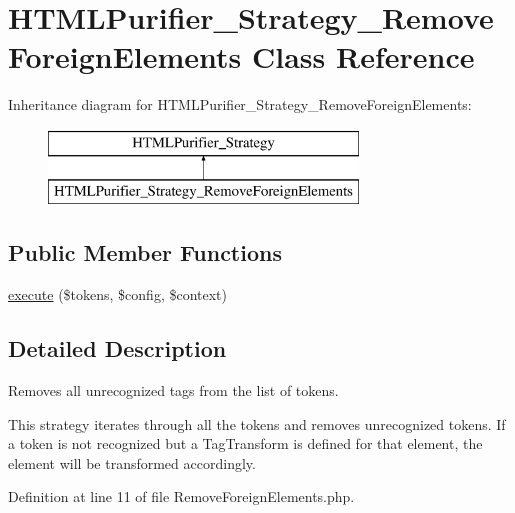 \hypertarget{classHTMLPurifier__Strategy__RemoveForeignElements}{\section{H\+T\+M\+L\+Purifier\+\_\+\+Strategy\+\_\+\+Remove\+Foreign\+Elements Class Reference}
\label{classHTMLPurifier__Strategy__RemoveForeignElements}
}
Inheritance diagram for H\+T\+M\+L\+Purifier\+\_\+\+Strategy\+\_\+\+Remove\+Foreign\+Elements\+:\begin{figure}[H]
\begin{center}
\leavevmode
\includegraphics[height=2.000000cm]{classHTMLPurifier__Strategy__RemoveForeignElements}
\end{center}
\end{figure}
\subsection*{Public Member Functions}
\begin{DoxyCompactItemize}
\item 
\hyperlink{classHTMLPurifier__Strategy__RemoveForeignElements_a604d38875364db23fd75f528632deb45}{execute} (\$tokens, \$config, \$context)
\end{DoxyCompactItemize}


\subsection{Detailed Description}
Removes all unrecognized tags from the list of tokens.

This strategy iterates through all the tokens and removes unrecognized tokens. If a token is not recognized but a Tag\+Transform is defined for that element, the element will be transformed accordingly. 

Definition at line 11 of file Remove\+Foreign\+Elements.\+php.



